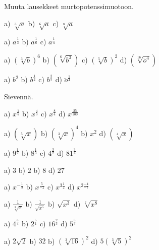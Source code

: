 \begin{tehtavasivu}

Muuta lausekkeet murtopotenssimuotoon.

\begin{tehtava}
a) $\sqrt[3]{a}$ \qquad
b) $\sqrt[6]{a}$ \qquad
c) $\sqrt[n]{a}$ 
\begin{vastaus}	
a) $a^\frac{1}{3}$ \qquad
b) $a^\frac{1}{6}$ \qquad
c) $a^\frac{1}{n}$ \qquad
\end{vastaus}
\end{tehtava}

\begin{tehtava}
a) $(\sqrt[3]{b})^6$ \qquad
b) $(\sqrt[6]{b^3})$ \qquad
c) $(\sqrt[5]{b})^2$ \qquad
d) $(\sqrt[16]{\ddot{o}^4})$
\begin{vastaus}	
a) $b^2$ \qquad
b) $b^\frac{1}{2}$ \qquad
c) $b^\frac{2}{5}$ \qquad
d) $\ddot{o}^\frac{1}{4}$
\end{vastaus}
\end{tehtava}

Sievennä.
\begin{tehtava}
a) $x^\frac{1}{5}$ \qquad
b) $x^\frac{4}{3}$ \qquad
c) $x^\frac{8}{4}$ \qquad
d) $x^\frac{25}{100}$ \qquad
\begin{vastaus}	
a) $(\sqrt[5]{x})$ \qquad
b) $(\sqrt[3]{x})^4$ \qquad
b) $x^2$ \qquad
d) $(\sqrt[4]{x})$ 
\end{vastaus}
\end{tehtava}

\begin{tehtava}
a) $9^\frac{1}{2}$ \qquad
b) $8^\frac{1}{3}$ \qquad
c) $4^\frac{3}{2}$ \qquad
d) $81^\frac{3}{4}$ \qquad
\begin{vastaus}	
a) $3$ \qquad
b) $2$ \qquad
b) $8$ \qquad
d) $27$ 
\end{vastaus}
\end{tehtava}

\begin{tehtava}
a) $x^{-\frac{1}{3}}$ \qquad
b) $x^\frac{5}{-2}$ \qquad
c) $x^{3 \frac{1}{2}}$ \qquad
d) $x^{2 \frac{-4}{-7}}$ \qquad
\begin{vastaus}	
a) $\frac{1}{\sqrt[3]{x}}$ \qquad
b) $\frac{1}{\sqrt{x^5}}$ \qquad
b) $\sqrt{x^3}$ \qquad
d) $\sqrt[7]{x^8}$ 
\end{vastaus}
\end{tehtava}

\begin{tehtava}
a) $4^\frac{3}{4}$ \qquad
b) $2^\frac{5}{1}$ \qquad
c) $16^\frac{2}{3}$ \qquad
d) $5^\frac{5}{3}$ \qquad
\begin{vastaus}	
a) $2\sqrt{2}$ \qquad
b) $32$ \qquad
b) $(\sqrt[3]{16})^2$ \qquad
d) $5(\sqrt[3]{5})^2$ 
\end{vastaus}
\end{tehtava}


\end{tehtavasivu}
